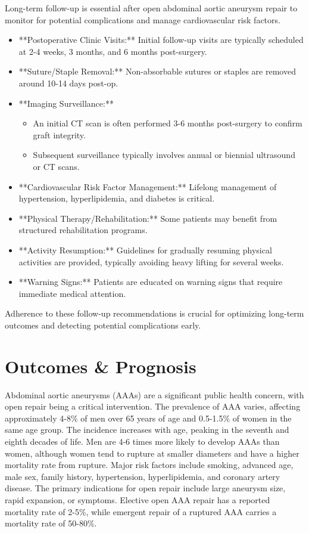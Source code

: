 Long-term follow-up is essential after open abdominal aortic aneurysm repair to monitor for potential complications and manage cardiovascular risk factors.

\begin{itemize}
  \item **Postoperative Clinic Visits:** Initial follow-up visits are typically scheduled at 2-4 weeks, 3 months, and 6 months post-surgery.
  \item **Suture/Staple Removal:** Non-absorbable sutures or staples are removed around 10-14 days post-op.
  \item **Imaging Surveillance:**
    \begin{itemize}
      \item An initial CT scan is often performed 3-6 months post-surgery to confirm graft integrity.
      \item Subsequent surveillance typically involves annual or biennial ultrasound or CT scans.
    \end{itemize}
  \item **Cardiovascular Risk Factor Management:** Lifelong management of hypertension, hyperlipidemia, and diabetes is critical.
  \item **Physical Therapy/Rehabilitation:** Some patients may benefit from structured rehabilitation programs.
  \item **Activity Resumption:** Guidelines for gradually resuming physical activities are provided, typically avoiding heavy lifting for several weeks.
  \item **Warning Signs:** Patients are educated on warning signs that require immediate medical attention.
\end{itemize}

Adherence to these follow-up recommendations is crucial for optimizing long-term outcomes and detecting potential complications early.

\section*{Outcomes \& Prognosis}
Abdominal aortic aneurysms (AAAs) are a significant public health concern, with open repair being a critical intervention. The prevalence of AAA varies, affecting approximately 4-8\% of men over 65 years of age and 0.5-1.5\% of women in the same age group. The incidence increases with age, peaking in the seventh and eighth decades of life. Men are 4-6 times more likely to develop AAAs than women, although women tend to rupture at smaller diameters and have a higher mortality rate from rupture. Major risk factors include smoking, advanced age, male sex, family history, hypertension, hyperlipidemia, and coronary artery disease. The primary indications for open repair include large aneurysm size, rapid expansion, or symptoms. Elective open AAA repair has a reported mortality rate of 2-5\%, while emergent repair of a ruptured AAA carries a mortality rate of 50-80\%.

